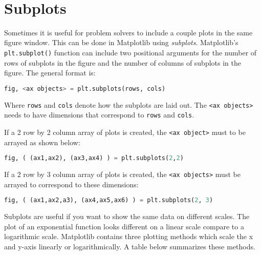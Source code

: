 \documentclass{book}
\newcommand{\passthrough}[1]{#1}
\begin{document}
    \begin{center}
    \end{center}
    { \hspace*{\fill} \\}
    

    
        \hypertarget{subplots}{%
\section{Subplots}\label{subplots}}
    




    
        Sometimes it is useful for problem solvers to include a couple plots in
the same figure window. This can be done in Matplotlib using
\emph{subplots}. Matplotlib's \passthrough{\lstinline!plt.subplot()!}
function can include two positional arguments for the number of rows of
subplots in the figure and the number of columns of subplots in the
figure. The general format is:

\begin{lstlisting}[language=Python]
fig, <ax objects> = plt.subplots(rows, cols)
\end{lstlisting}

Where \passthrough{\lstinline!rows!} and \passthrough{\lstinline!cols!}
denote how the subplots are laid out. The
\passthrough{\lstinline!<ax objects>!} needs to have dimensions that
correspond to \passthrough{\lstinline!rows!} and
\passthrough{\lstinline!cols!}.

If a 2 row by 2 column array of plots is created, the
\passthrough{\lstinline!<ax object>!} must to be arrayed as shown below:

\begin{lstlisting}[language=Python]
fig, ( (ax1,ax2), (ax3,ax4) ) = plt.subplots(2,2)   
\end{lstlisting}

If a 2 row by 3 column array of plots is created, the
\passthrough{\lstinline!<ax objects>!} must be arrayed to correspond to
these dimensions:

\begin{lstlisting}[language=Python]
fig, ( (ax1,ax2,a3), (ax4,ax5,ax6) ) = plt.subplots(2, 3)   
\end{lstlisting}

Subplots are useful if you want to show the same data on different
scales. The plot of an exponential function looks different on a linear
scale compare to a logarithmic scale. Matplotlib contains three plotting
methods which scale the x and y-axis linearly or logarithmically. A
table below summarizes these methods.
\end{document}
